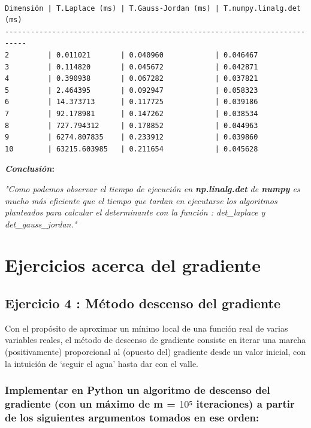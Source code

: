 \documentclass[11pt]{article}
\begin{document}
\begin{tcolorbox}[breakable, size=fbox, boxrule=1pt, pad at break*=1mm,colback=cellbackground, colframe=cellborder]
\begin{Verbatim}[commandchars=\\\{\}]
  
\end{Verbatim}
\end{tcolorbox}

    \begin{Verbatim}[commandchars=\\\{\}]
Dimensión | T.Laplace (ms) | T.Gauss-Jordan (ms) | T.numpy.linalg.det (ms)
---------------------------------------------------------------------------
2         | 0.011021       | 0.040960            | 0.046467
3         | 0.114820       | 0.045672            | 0.042871
4         | 0.390938       | 0.067282            | 0.037821
5         | 2.464395       | 0.092947            | 0.058323
6         | 14.373713      | 0.117725            | 0.039186
7         | 92.178981      | 0.147262            | 0.038534
8         | 727.794312     | 0.178852            | 0.044963
9         | 6274.807835    | 0.233912            | 0.039860
10        | 63215.603985   | 0.211654            | 0.045628
    \end{Verbatim}

    \textbf{\textbf{\emph{Conclusión}}:}

    \emph{"Como podemos observar el tiempo de ejecución en
\textbf{np.linalg.det} de \textbf{numpy} es mucho más eficiente que el
tiempo que tardan en ejecutarse los algoritmos planteados para calcular
el determinante con la función : det\_laplace y det\_gauss\_jordan."}

    \section{Ejercicios acerca del
gradiente}\label{ejercicios-acerca-del-gradiente}

\subsection{Ejercicio 4 : Método descenso del
gradiente}\label{ejercicio-4-muxe9todo-descenso-del-gradiente}

Con el propósito de aproximar un mínimo local de una función real de
varias variables reales, el método de descenso de gradiente consiste en
iterar una marcha (positivamente) proporcional al (opuesto del)
gradiente desde un valor inicial, con la intuición de `seguir el agua'
hasta dar con el valle.

\subsubsection{\texorpdfstring{Implementar en Python un algoritmo de
descenso del gradiente (con un máximo de m = \(10⁵\) iteraciones) a
partir de los siguientes argumentos tomados en ese
orden:}{Implementar en Python un algoritmo de descenso del gradiente (con un máximo de m = 10⁵ iteraciones) a partir de los siguientes argumentos tomados en ese orden:}}\label{implementar-en-python-un-algoritmo-de-descenso-del-gradiente-con-un-muxe1ximo-de-m-10-iteraciones-a-partir-de-los-siguientes-argumentos-tomados-en-ese-orden}
\end{document}
